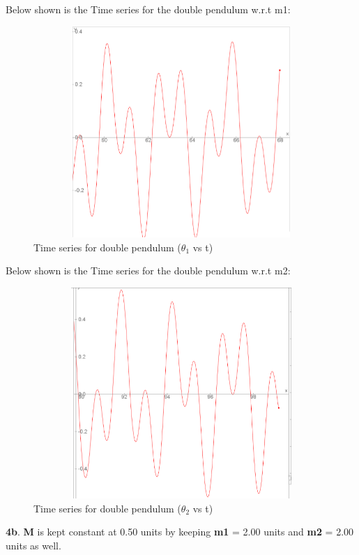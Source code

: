 \documentclass[11pt]{scrartcl} %
\begin{document}
Below shown is the Time series for the double pendulum w.r.t m1:
\begin{figure}[h] %
	\centering
	\includegraphics[width=12cm, height=8cm]{Figures/M 4a angle 1 (1).png} %
	\caption{Time series for double pendulum ($\theta_{1}$ vs t)}
\end{figure}

Below shown is the Time series for the double pendulum w.r.t m2:
\begin{figure}[h] %
	\centering
	\includegraphics[width=12cm, height=8cm]{Figures/M 4a angle 2.png} %
	\caption{Time series for double pendulum ($\theta_{2}$ vs t)}
\end{figure}


\newpage
\textbf{4b}.
\textbf{M} is kept constant at 0.50 units by keeping \textbf{m1} = 2.00 units and \textbf{m2} = 2.00 units as well.\\
\end{document}
